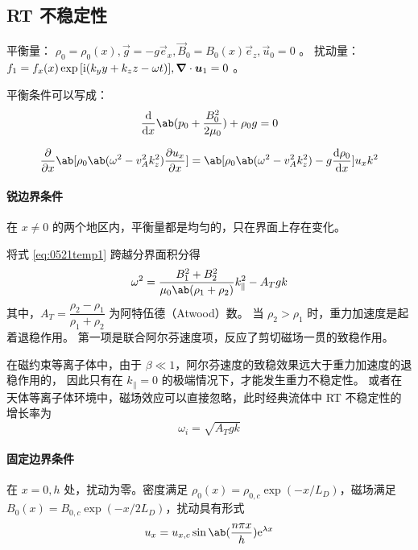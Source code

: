 \subsection{RT 不稳定性}

平衡量：
$\rho_0 = \rho_0(x),
\vec{g} = - g \vec{e}_x,
\vec{B}_0 = B_0(x) \vec{e}_z,
\vec{u}_0 = 0 $ 。
扰动量：
$f_1 = f_x(x) \exp{[\mathrm{i}(k_y y + k_z z - \omega t)]},
\bm{\nabla} \cdot{\bm{u}_1} = 0 $ 。

平衡条件可以写成：
\begin{equation}
\odv{}{x} \ab(p_0 + \frac{B_0^2}{2 \mu_0} ) + \rho_0 g = 0
\end{equation}

\begin{equation} \label{eq:0521temp1}
\pdv{}{x} \ab[
    \rho_0 \ab( \omega^2 - v_A^2 k_z^2 )
    \pdv{u_x}{x}
]
= \ab[
    \rho_0 \ab( \omega^2 - v_A^2 k_z^2 )
    - g \odv{\rho_0}{x}
] u_x k^2
\end{equation}

\paragraph{锐边界条件}
在 $x \neq 0$ 的两个地区内，平衡量都是均匀的，只在界面上存在变化。

将式 \ref{eq:0521temp1} 跨越分界面积分得
\begin{equation}
\omega^2
= \frac{B_1^2 + B_2^2}{\mu_0 \ab(\rho_1 + \rho_2)} k_\parallel^2
- A_T g k
\end{equation}
其中，$A_T = \dfrac{\rho_2 - \rho_1}{\rho_1 + \rho_2}$ 为阿特伍德（Atwood）数。
当 $\rho_2 > \rho_1$ 时，重力加速度是起着退稳作用。
第一项是联合阿尔芬速度项，反应了剪切磁场一贯的致稳作用。

在磁约束等离子体中，由于 $\beta \ll 1$，阿尔芬速度的致稳效果远大于重力加速度的退稳作用的，
因此只有在 $k_\parallel = 0$ 的极端情况下，才能发生重力不稳定性。
或者在天体等离子体环境中，磁场效应可以直接忽略，此时经典流体中 RT 不稳定性的增长率为
\begin{equation}
\omega_i = \sqrt{A_T g k}
\end{equation}

\paragraph{固定边界条件} 在 $x = 0, h$ 处，扰动为零。密度满足 $\rho_0(x) = \rho_{0,c} \exp{(- x / L_D)} $，磁场满足 $B_0(x) = B_{0,c} \exp{(- x / 2 L_D)}$，扰动具有形式
\begin{equation}
u_x = u_{x,c} \sin{\ab(\frac{n \pi x}{h})} \eu^{\lambda x}
\end{equation}

